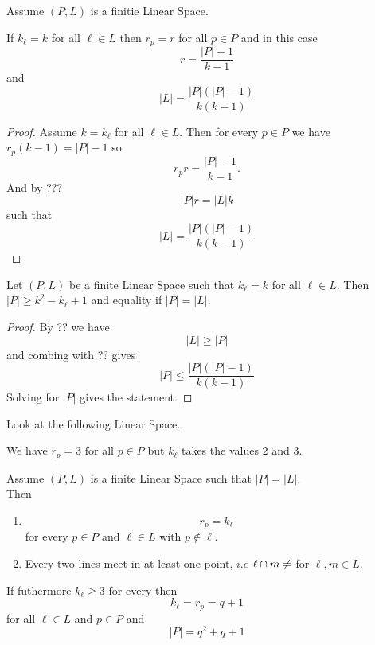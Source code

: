 \begin{Kor}
Assume \((P,L)\) is a finitie Linear Space.

If \(k_\ell=k\) for all \(\ell\in L\) then 
\(r_p=r\) for all \(p\in P\) and in this case 
\[r=\dfrac{|P|-1}{k-1}\] and 
\[|L|=\dfrac{|P|(|P|-1)}{k(k-1)}\]
\end{Kor}
\begin{proof}
Assume \(k=k_\ell\) for all \(\ell\in L\). 
Then for every \(p\in P\) we have
\(r_p(k-1)=|P|-1\) so \[r_pr=\dfrac{|P|-1}{k-1}.\]
And by ??? \[|P|r=|L|k\] such that 
\[|L|=\dfrac{|P|(|P|-1)}{k(k-1)}\]

\end{proof}
\begin{Kor}
Let \((P,L)\) be a finite Linear Space such that \(k_\ell=k\) for all \(\ell\in L\).
Then \(|P|\geq k^2-k_\ell+1\) and equality if \(|P|=|L|\).
\end{Kor}
\begin{proof}
    By ?? we have 
    \[|L|\geq |P|\] and combing with ?? gives 
    \[|P|\leq\dfrac{|P|(|P|-1)}{k(k-1)}\]  
    Solving for \(|P|\) gives the statement.
\end{proof}
\begin{Bsp}
Look at the following Linear Space.
\begin{figure}[H]
    \centering
\end{figure}
We have \(r_p=3\) for all \(p\in P\) but \(k_\ell\) takes the values 
\(2\) and \(3\).
\end{Bsp}
\begin{Satz}
Assume \((P,L)\) is a finite Linear Space such that \(|P|=|L|\).\\
Then 
\begin{enumerate}
    \item \[r_p=k_\ell\] for every \(p\in P\) and \(\ell\in L\) with 
\(p\not\in \ell\).

\item Every two lines meet in 
at least one point, \(i.e\) \(\ell\cap m\neq\empty\) for \(\ell,m\in L\).
\end{enumerate}
If futhermore \(k_\ell\geq 3\) for every then 
\[k_\ell=r_p=q+1\] for all \(\ell\in L\) and \(p\in P\) and \[|P|=q^2+q+1\]
\end{Satz}

